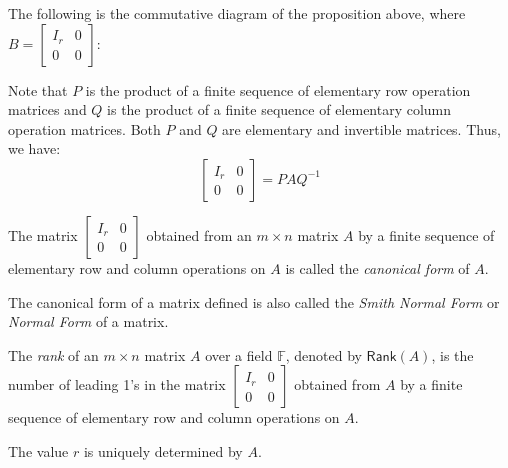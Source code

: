 \documentclass[
	11pt, %
	fleqn, %
	a4paper, %
]{LegrandOrangeBook}
\newcommand{\F}{\mathbb{F}} %
\newcommand{\rank}[1]{\mathsf{Rank}(#1)} %
\begin{document}
The following is the commutative diagram of the proposition above, where $B = \begin{bmatrix}
    I_r & 0 \\
    0 & 0
\end{bmatrix}$:

\begin{center}
\end{center}

Note that $P$ is the product of a finite sequence of elementary row operation matrices and $Q$ is the product of a finite sequence of elementary column operation matrices. Both $P$ and $Q$ are elementary and invertible matrices. Thus, we have:
\[
    \begin{bmatrix}
        I_r & 0 \\
        0 & 0
    \end{bmatrix} = P A Q^{-1}
\]

\begin{definition}
    The matrix $\begin{bmatrix}
        I_r & 0 \\
        0 & 0
    \end{bmatrix}$ obtained from an $m \times n$ matrix $A$ by a finite sequence of elementary row and column operations on $A$ is called the \emph{canonical form} of $A$.    
\end{definition}
\begin{remark}
    The canonical form of a matrix defined is also called the \emph{Smith Normal Form} or \emph{Normal Form} of a matrix.
\end{remark}

\begin{definition}
    The \emph{rank} of an $m \times n$ matrix $A$ over a field $\F$, denoted by $\rank{A}$, is the number of leading 1's in the matrix $\begin{bmatrix}
        I_r & 0 \\
        0 & 0
    \end{bmatrix}$ obtained from $A$ by a finite sequence of elementary row and column operations on $A$.
\end{definition}
\begin{remark}
    The value $r$ is uniquely determined by $A$.
\end{remark}
\end{document}
